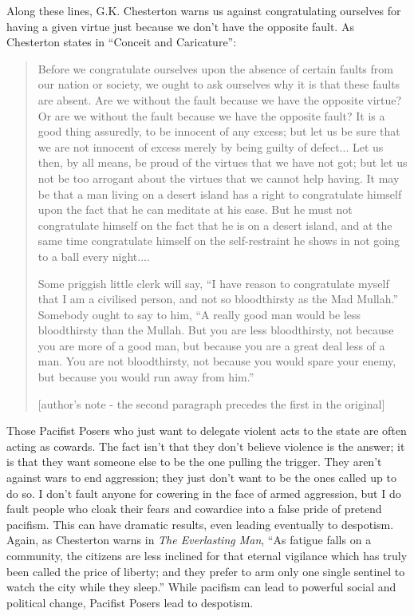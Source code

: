 Along these lines, G.K. Chesterton warns us against congratulating
ourselves for having a given virtue just because we don’t have the
opposite fault. As Chesterton states in ``Conceit and
Caricature'':

\begin{quote}
Before we congratulate ourselves upon the absence of certain faults from
our nation or society, we ought to ask ourselves why it is that these
faults are absent. Are we without the fault because we have the
opposite virtue? Or are we without the fault because we have the
opposite fault? It is a good thing assuredly, to be innocent of any
excess; but let us be sure that we are not innocent of excess merely by
being guilty of defect... Let us then, by all means, be proud of the
virtues that we have not got; but let us not be too arrogant about the
virtues that we cannot help having. It may be that a man living on a
desert island has a right to congratulate himself upon the fact that he
can meditate at his ease. But he must not congratulate himself on the
fact that he is on a desert island, and at the same time congratulate
himself on the self-restraint he shows in not going to a ball every
night....

Some priggish little clerk will say, ``I have reason to
congratulate myself that I am a civilised person, and not so
bloodthirsty as the Mad Mullah.'' Somebody ought to say to
him, ``A really good man would be less bloodthirsty than
the Mullah. But you are less bloodthirsty, not because you are more of
a good man, but because you are a great deal less of a man. You are not
bloodthirsty, not because you would spare your enemy, but because you
would run away from him.''

[author’s note - the second paragraph precedes the first in the
original]
\end{quote}

Those Pacifist Posers who just want to delegate violent acts to the
state are often acting as cowards. The fact isn’t that they don’t
believe violence is the answer; it is that they want someone else to be
the one pulling the trigger. They aren’t against wars to end
aggression; they just don’t want to be the ones called up to do so. I
don’t fault anyone for cowering in the face of armed aggression, but I
do fault people who cloak their fears and cowardice into a false pride
of pretend pacifism. This can have dramatic results, even leading
eventually to despotism. Again, as Chesterton warns in \textit{The
Everlasting Man}, “As fatigue falls on a community, the citizens are
less inclined for that eternal vigilance which has truly been called
the price of liberty; and they prefer to arm only one single sentinel
to watch the city while they sleep.”  While pacifism can lead to
powerful social and political change, Pacifist Posers lead to
despotism.

